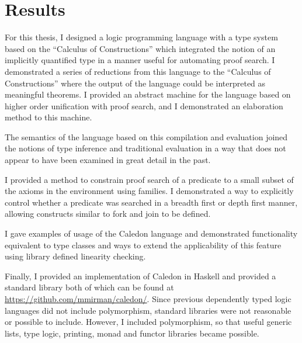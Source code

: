\section{Results}

For this thesis, I designed a logic programming language with a type system based on the
``Calculus of Constructions'' which integrated the notion of an implicitly quantified type in
a manner useful for automating proof search. I demonstrated a series of reductions from
this language to the ``Calculus of Constructions'' where the output of the language could
be interpreted as meaningful theorems. I provided an abstract machine for the language
based on higher order unification with proof search, and I demonstrated an elaboration
method to this machine. 

The semantics of the language based on this compilation and
evaluation joined the notions of type inference and traditional evaluation in a way that
does not appear to have been examined in great detail in the past.

I provided a method to constrain proof search of a predicate to a small subset of the
axioms in the environment using families. I demonstrated a way to explicitly control
whether a predicate was searched in a breadth first or depth first manner, allowing
constructs similar to fork and join to be defined.

I gave examples of usage of the Caledon language and demonstrated functionality
equivalent to type classes and ways to extend the applicability of this feature using library defined linearity checking.  

Finally, I provided an implementation of Caledon in Haskell and provided a
standard library both of which can be found at \hyperref[https://github.com/mmirman/caledon/]{https://github.com/mmirman/caledon/}. Since previous dependently typed logic languages did not include
polymorphism, standard libraries were not reasonable or possible to include. However, I included 
polymorphism, so that useful generic lists, type logic, printing, monad and
functor libraries became possible.
